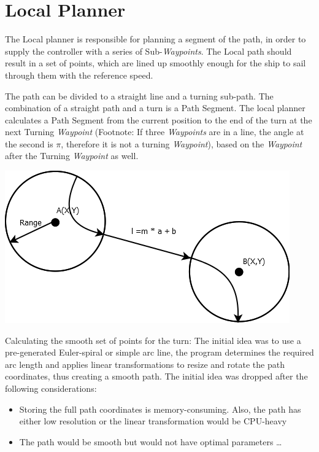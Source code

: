 \section{Local Planner}

The Local planner is responsible for planning a segment of the path, in order to supply the controller with a series of Sub-\emph{Waypoints}. The Local path should result in a set of points, which are lined up smoothly enough for the ship to sail through them with the reference speed.

The path can be divided to a straight line and a turning sub-path. The combination of a straight path and a turn is a Path Segment. The local planner calculates a Path Segment from the current position to the end of the turn at the next Turning \emph{Waypoint} (Footnote: If three \emph{Waypoints} are in a line, the angle at the second is $\pi$, therefore it is not a turning \emph{Waypoint}), based on the \emph{Waypoint} after the Turning \emph{Waypoint} as well.

\includegraphics[width = \textwidth]{img/LocalPlannerFigures/StraightRoute.png}

Calculating the smooth set of points for the turn:
The initial idea was to use a pre-generated Euler-spiral or simple arc line, the program determines the required arc length and applies linear transformations to resize and rotate the path coordinates, thus creating a smooth path.
The initial idea was dropped after the following considerations:
\begin{itemize}
\item Storing the full path coordinates is memory-consuming. Also, the path has either low resolution or the linear transformation would be CPU-heavy
\item The path would be smooth but would not have optimal parameters \ldots
\end{itemize}


